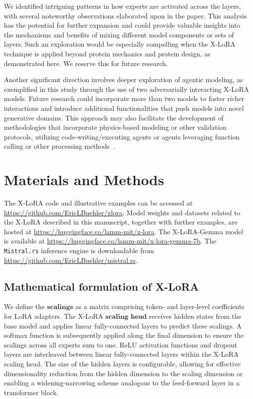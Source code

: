 We identified intriguing patterns in how experts are activated across the layers, with several noteworthy observations elaborated upon in the paper. This analysis has the potential for further expansion and could provide valuable insights into the mechanisms and benefits of mixing different model components or sets of layers. Such an exploration would be especially compelling when the X-LoRA technique is applied beyond protein mechanics and protein design, as demonstrated here. We reserve this for future research.

Another significant direction involves deeper exploration of agentic modeling, as exemplified in this study through the use of two adversarially interacting X-LoRA models. Future research could incorporate more than two models to foster richer interactions and introduce additional functionalities that push models into novel generative domains. This approach may also facilitate the development of methodologies that incorporate physics-based modeling or other validation protocols, utilizing code-writing/executing agents or agents leveraging function calling or other processing methods~\cite{Ghafarollahi2024ProtAgents:Learning}.

\section{Materials and Methods}

The X-LoRA code and illustrative examples can be accessed at \url{https://github.com/EricLBuehler/xlora}. Model weights and datasets related to the X-LoRA described in this manuscript, together with further examples, are hosted at \url{https://huggingface.co/lamm-mit/x-lora}. The X-LoRA-Gemma model is available at \url{https://huggingface.co/lamm-mit/x-lora-gemma-7b}. The \texttt{Mistral.rs} inference engine is downloadable from \url{https://github.com/EricLBuehler/mistral.rs}.

\subsection{Mathematical formulation of X-LoRA} We define the $\mathbf{scalings}$ as a matrix comprising token- and layer-level coefficients for LoRA adapters. The X-LoRA $\mathbf{scaling}$ $\mathbf{head}$ receives hidden states from the base model and applies linear fully-connected layers to predict these scalings. A softmax function is subsequently applied along the final dimension to ensure the scalings across all experts sum to one. ReLU activation functions and dropout layers are interleaved between linear fully-connected layers within the X-LoRA scaling head. The size of the hidden layers is configurable, allowing for effective dimensionality reduction from the hidden dimension to the scaling dimension or enabling a widening-narrowing scheme analogous to the feed-forward layer in a transformer block.

